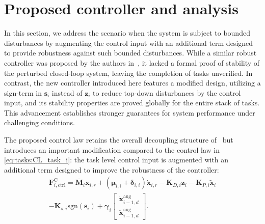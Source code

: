 \documentclass[../main.tex]{subfiles}
\begin{document}





\section{Proposed controller and analysis}\label{sec:comp:robust}
In this section, we address the scenario when the system is subject to bounded disturbances by augmenting the control input with an additional term designed to provide robustness against such bounded disturbances. While a similar robust controller was proposed by the authors in~\cite{Saeboe2022}, it lacked a formal proof of stability of the perturbed closed-loop system, leaving the completion of tasks unverified. In contrast, the new controller introduced here features a modified design, utilizing a sign-term in $\bm{s}_i$ instead of $\bm{z}_i$ to reduce top-down disturbances by the control input, and its stability properties are proved globally for the entire stack of tasks. This advancement establishes stronger guarantees for system performance under challenging conditions.


The proposed control law retains the overall decoupling structure of~ but introduces an important modification compared to the control law in \eqref{eq:tasks:CL_task_i}: the task level control input is augmented with an additional term designed to improve the robustness of the controller:
\begin{multline}\label{eq:comp:Fictrl_robust}
    \bm{F}_{i,\textrm{ctrl}}^{\textrm{C}} = \bar{\bm{M}}_i \ddot{\bm{x}}_{i,r} + \left( \bm{\mu}_{i,i} + \bm{\delta}_{i,i} \right) \dot{\bm{x}}_{i,r} - \bm{K}_{D,i} \bm{z}_i - \bm{K}_{P,i} \tilde{\bm{x}}_i \\
        - \bm{K}_{s,i} \textrm{sgn} (\bm{s}_i)
        + \bm{\gamma}_i \begin{bmatrix} \dot{\bm{x}}^{\textrm{aug}}_{i-1,d} \\ \ddot{\bm{x}}^{\textrm{aug}}_{i-1,d}
        \end{bmatrix}.
\end{multline}
\end{document}
